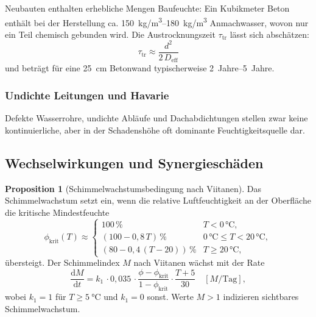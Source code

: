 ﻿\documentclass[a4paper,12pt]{article}
\theoremstyle{definition}
\newtheorem{proposition}[theorem]{Proposition}
\begin{document}
Neubauten enthalten erhebliche Mengen Baufeuchte: Ein Kubikmeter
Beton enth\"alt bei der Herstellung ca. \SIrange{150}{180}{kg/m^3}
Anmachwasser, wovon nur ein Teil chemisch gebunden wird.
Die Austrocknungszeit $\tau_{\mathrm{tr}}$ l\"asst sich absch\"atzen:
\begin{equation}
  \tau_{\mathrm{tr}} \approx \frac{d^2}{2\,D_{\mathrm{eff}}}
  \label{eq:trocknung}
\end{equation}
und betr\"agt f\"ur eine \SI{25}{cm} Betonwand typischerweise
\SIrange{2}{5}{Jahre}.

\subsubsection{Undichte Leitungen und Havarie}

Defekte Wasserrohre, undichte Abl\"aufe und Dachabdichtungen stellen
zwar keine kontinuierliche, aber in der Schadensh\"ohe oft dominante
Feuchtigkeitsquelle dar.

\subsection{Wechselwirkungen und Synergiesch\"aden}

\begin{proposition}[Schimmelwachstumsbedingung nach Viitanen]
\label{prop:viitanen}
Das Schimmelwachstum setzt ein, wenn die relative Luftfeuchtigkeit
an der Oberfl\"ache die kritische Mindestfeuchte
\begin{equation}
  \phi_{\mathrm{krit}}(T) \approx
  \begin{cases}
    100\,\% & T < 0\,\si{\celsius}, \\
    (100 - 0{,}8\,T)\,\% & 0\,\si{\celsius} \le T < 20\,\si{\celsius}, \\
    (80 - 0{,}4\,(T-20))\,\% & T \ge 20\,\si{\celsius},
  \end{cases}
  \label{eq:phi_krit}
\end{equation}
\"ubersteigt. Der Schimmelindex $M$ nach Viitanen w\"achst mit der Rate
\begin{equation}
  \frac{\mathrm{d}M}{\mathrm{d}t} = k_1\,\cdot 0{,}035\,\cdot
  \frac{\phi - \phi_{\mathrm{krit}}}{1 - \phi_{\mathrm{krit}}}
  \cdot \frac{T + 5}{30}
  \quad [M/\mathrm{Tag}],
  \label{eq:viitanen}
\end{equation}
wobei $k_1 = 1$ f\"ur $T \ge \SI{5}{\celsius}$ und $k_1 = 0$ sonst.
Werte $M > 1$ indizieren sichtbares Schimmelwachstum.
\end{proposition}
\end{document}
